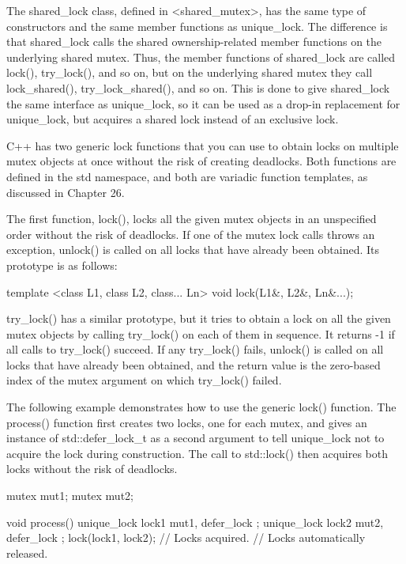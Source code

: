
The shared\_lock class, defined in <shared\_mutex>, has the same type of constructors and the same member functions as unique\_lock. The difference is that shared\_lock calls the shared ownership-related member functions on the underlying shared mutex. Thus, the member functions of shared\_lock are called lock(), try\_lock(), and so on, but on the underlying shared mutex they call lock\_shared(), try\_lock\_shared(), and so on. This is done to give shared\_lock the same interface as unique\_lock, so it can be used as a drop-in replacement for unique\_lock, but acquires a shared lock instead of an exclusive lock.


C++ has two generic lock functions that you can use to obtain locks on multiple mutex objects at once without the risk of creating deadlocks. Both functions are defined in the std namespace, and both are variadic function templates, as discussed in Chapter 26.

The first function, lock(), locks all the given mutex objects in an unspecified order without the risk of deadlocks. If one of the mutex lock calls throws an exception, unlock() is called on all locks that have already been obtained. Its prototype is as follows:

\begin{cpp}
template <class L1, class L2, class... Ln> void lock(L1&, L2&, Ln&...);
\end{cpp}

try\_lock() has a similar prototype, but it tries to obtain a lock on all the given mutex objects by calling try\_lock() on each of them in sequence. It returns -1 if all calls to try\_lock() succeed. If any try\_lock() fails, unlock() is called on all locks that have already been obtained, and the return value is the zero-based index of the mutex argument on which try\_lock() failed.

The following example demonstrates how to use the generic lock() function. The process() function first creates two locks, one for each mutex, and gives an instance of std::defer\_lock\_t as a second argument to tell unique\_lock not to acquire the lock during construction. The call to std::lock() then acquires both locks without the risk of deadlocks.

\begin{cpp}
mutex mut1;
mutex mut2;

void process()
{
    unique_lock lock1 { mut1, defer_lock };
    unique_lock lock2 { mut2, defer_lock };
    lock(lock1, lock2);
    // Locks acquired.
} // Locks automatically released.
\end{cpp}

